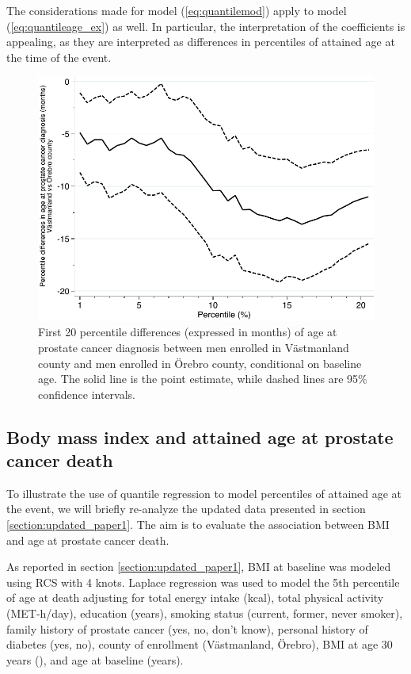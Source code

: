 The considerations made for model (\ref{eq:quantilemod}) apply to model (\ref{eq:quantileage_ex}) as well. In particular, the interpretation of the coefficients is appealing, as they are interpreted as differences in percentiles of attained age at the time of the event.

\begin{figure}[hb]
\centering
\includegraphics[width=.8\linewidth]{figures/allp.pdf}
\caption[Percentile differences in age at prostate cancer diagnosis between counties of enrollment in the COSM]{First 20 percentile differences (expressed in months) of age at prostate cancer diagnosis between men enrolled in Västmanland county and men enrolled in Örebro county, conditional on baseline age. The solid line is the point estimate, while dashed lines are 95\% confidence intervals.}
\label{fig:allp}
\end{figure}

\subsection{Body mass index and attained age at prostate cancer death}

To illustrate the use of quantile regression to model percentiles of attained age at the event, we will briefly re-analyze the updated data presented in section \ref{section:updated_paper1}. The aim is to evaluate the association between BMI and age at prostate cancer death. 

As reported in section \ref{section:updated_paper1}, BMI at baseline was modeled using RCS with 4 knots. Laplace regression was used to model the 5th percentile of age at death adjusting for total energy intake (kcal), total physical activity (MET-h/day), education (years), smoking status (current, former, never smoker), family history of prostate cancer (yes, no, don’t know), personal history of diabetes (yes, no), county of enrollment (Västmanland, Örebro), BMI at age 30 years (\kgmsq), and age at baseline (years).

